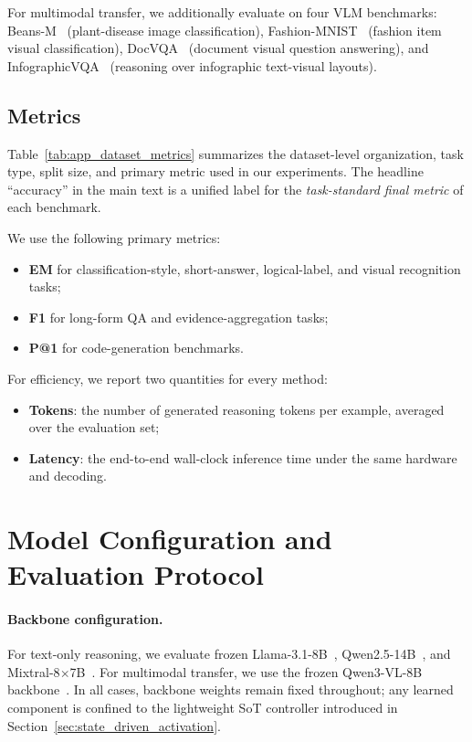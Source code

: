 For multimodal transfer, we additionally evaluate on four VLM benchmarks:
Beans-M~\citep{makerere2020beans} (plant-disease image classification), Fashion-MNIST~\citep{xiao2017fashion} (fashion item visual classification), DocVQA~\citep{mathew2021docvqa} (document visual question answering), and InfographicVQA~\citep{mathew2022infographicvqa} (reasoning over infographic text-visual layouts).

\vspace{-2mm}
\subsection{Metrics}
\vspace{-1mm}
Table~\ref{tab:app_dataset_metrics} summarizes the dataset-level organization, task type, split size, and primary metric used in our experiments.
The headline ``accuracy'' in the main text is a unified label for the \emph{task-standard final metric} of each benchmark.

We use the following primary metrics:
\begin{itemize}[leftmargin=1.5em]
    \item \textbf{EM} for classification-style, short-answer, logical-label, and visual recognition tasks;
    \item \textbf{F1} for long-form QA and evidence-aggregation tasks;
    \item \textbf{P@1} for code-generation benchmarks.
\end{itemize}

For efficiency, we report two quantities for every method:
\begin{itemize}[leftmargin=1.5em]
    \item \textbf{Tokens}: the number of generated reasoning tokens per example, averaged over the evaluation set;
    \item \textbf{Latency}: the end-to-end wall-clock inference time under the same hardware and decoding.
\end{itemize}

\section{Model Configuration and Evaluation Protocol}
\label{app:model_protocol}

\paragraph{Backbone configuration.}
For text-only reasoning, we evaluate frozen Llama-3.1-8B~\citep{grattafiori2024llama3}, Qwen2.5-14B~\citep{yang2024qwen25}, and Mixtral-8$\times$7B~\citep{jiang2024mixtral}.
For multimodal transfer, we use the frozen Qwen3-VL-8B backbone~\citep{qwen2025qwen3vl8b}.
In all cases, backbone weights remain fixed throughout; any learned component is confined to the lightweight SoT controller introduced in Section~\ref{sec:state_driven_activation}.

